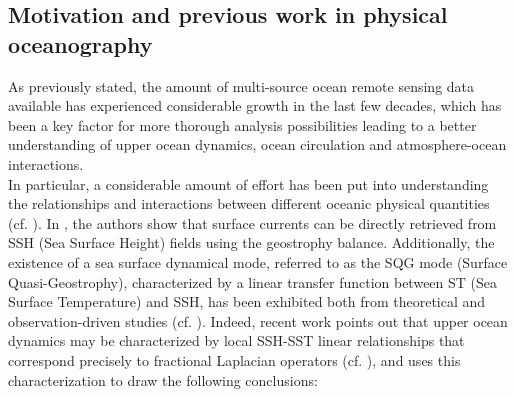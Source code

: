\documentclass[10pt]{extarticle}
\begin{document}
\subsection*{Motivation and previous work in physical oceanography}
As previously stated, the amount of multi-source ocean remote sensing data available has experienced considerable growth in the last few decades, which has been a key factor for more thorough analysis possibilities leading to a better understanding of upper ocean dynamics, ocean circulation and atmosphere-ocean interactions.\\
In particular, a considerable amount of effort has been put into understanding the relationships and interactions between different oceanic physical quantities (cf. \cite{methods_1,casey,SST_SSH_1,isern,leuliette,saraceno}). 
In \cite{tandeo}, the authors show that surface currents can be directly retrieved from SSH (Sea Surface Height)  fields using the geostrophy balance. Additionally, the existence of a sea surface dynamical mode, referred to as the SQG mode (Surface Quasi-Geostrophy), characterized by a linear transfer function between ST (Sea Surface Temperature) and SSH, has been exhibited both from theoretical and observation-driven studies (cf. \cite{tandeo,SST_SSH_1,SST_SSH_2,SST_SSH_3,SST_SSH_4,Lapeyre,Held,Klein}). Indeed, recent work points out that upper ocean dynamics may be characterized by local SSH-SST linear relationships that correspond precisely to fractional Laplacian operators (cf. \cite{tandeo,SST_SSH_1,SST_SSH_2,SST_SSH_3,SST_SSH_4,Lapeyre}), and uses this characterization to draw the following conclusions: %
\end{document}
